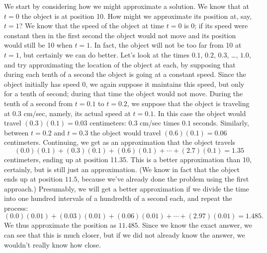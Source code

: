 We start by considering how we might approximate a solution. We know
that at $t=0$ the object is at position 10. How might we approximate
its position at, say, $t=1$? We know that the speed of the object at
time $t=0$ is $0$; if its speed were constant then in the first second
the object would not move and its position would still be 10 when
$t=1$. In fact, the object will not be too far from 10 at $t=1$, but
certainly we can do better. Let's look at the times $0.1$, $0.2$,
$0.3$, \dots, $1.0$, and try approximating the location of the object
at each, by supposing that during each tenth of a second the object is
going at a constant speed. Since the object initially has speed 0, we
again suppose it maintains this speed, but only for a tenth of second;
during that time the object would not move. During the tenth of a
second from $t=0.1$ to $t=0.2$, we suppose that the object is
traveling at $0.3$ cm/sec, namely, its actual speed at $t=0.1$. In
this case the object would travel $(0.3)(0.1)=0.03$ centimeters: $0.3$
cm/sec times $0.1$ seconds. Similarly, between $t=0.2$ and $t=0.3$ the
object would travel $(0.6)(0.1)=0.06$ centimeters.  Continuing, we get
as an approximation that the object travels
$$
  (0.0)(0.1)+(0.3)(0.1)+(0.6)(0.1)+\cdots+(2.7)(0.1)=1.35
$$ 
centimeters, ending up at position 11.35. This is a better
approximation than 10, certainly, but is still just an
approximation. (We know in fact that the object ends up at position
$11.5$, because we've already done the problem using the first
approach.) Presumably, we will get a better approximation if we divide
the time into one hundred intervals of a hundredth of a second each,
and repeat the process:
$$
  (0.0)(0.01)+(0.03)(0.01)+(0.06)(0.01)+\cdots+(2.97)(0.01)=1.485.
$$
We thus approximate the position as $11.485$. Since we know the exact
answer, we can see that this is much closer, but if we did not already
know the answer, we wouldn't really know how close.

